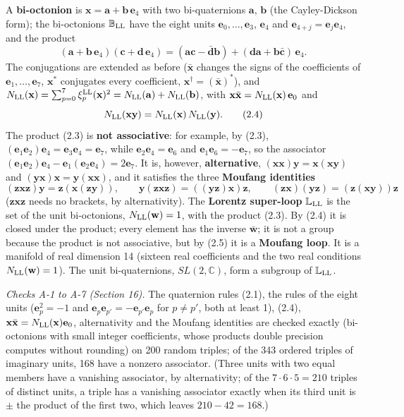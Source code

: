 \documentclass[
  10pt,
]{article}
\begin{document}
A \textbf{bi-octonion} is \(\mathbf x=\mathbf a+\mathbf b\,\mathbf e_4\)
with two bi-quaternions \(\mathbf a\), \(\mathbf b\) (the Cayley-Dickson
form); the bi-octonions \(\mathbb B_{\rm LL}\) have the eight units
\(\mathbf e_0,\dots,\mathbf e_3\), \(\mathbf e_4\) and
\(\mathbf e_{4+j}=\mathbf e_j\mathbf e_4\), and the product
\[(\mathbf a+\mathbf b\,\mathbf e_4)(\mathbf c+\mathbf d\,\mathbf e_4)=(\mathbf a\mathbf c-\bar{\mathbf d}\mathbf b)+(\mathbf d\mathbf a+\mathbf b\bar{\mathbf c})\,\mathbf e_4.\tag{2.3}\]
The conjugations are extended as before (\(\bar{\mathbf x}\) changes the
signs of the coefficients of \(\mathbf e_1,\dots,\mathbf e_7\),
\(\mathbf x^*\) conjugates every coefficient,
\(\mathbf x^\dagger=(\bar{\mathbf x})^*\)), and
\(N_{\rm LL}(\mathbf x)=\sum_{p=0}^7\xi^{\rm LL}_p(\mathbf x)^2=N_{\rm LL}(\mathbf a)+N_{\rm LL}(\mathbf b)\),
with \(\mathbf x\bar{\mathbf x}=N_{\rm LL}(\mathbf x)\,\mathbf e_0\) and
\[N_{\rm LL}(\mathbf x\mathbf y)=N_{\rm LL}(\mathbf x)\,N_{\rm LL}(\mathbf y).\tag{2.4}\]
The product (2.3) is \textbf{not associative}: for example, by (2.3),
\((\mathbf e_1\mathbf e_2)\mathbf e_4=\mathbf e_3\mathbf e_4=\mathbf e_7\),
while \(\mathbf e_2\mathbf e_4=\mathbf e_6\) and
\(\mathbf e_1\mathbf e_6=-\mathbf e_7\), so the associator
\((\mathbf e_1\mathbf e_2)\mathbf e_4-\mathbf e_1(\mathbf e_2\mathbf e_4)=2\mathbf e_7\).
It is, however, \textbf{alternative},
\((\mathbf x\mathbf x)\mathbf y=\mathbf x(\mathbf x\mathbf y)\) and
\((\mathbf y\mathbf x)\mathbf x=\mathbf y(\mathbf x\mathbf x)\), and it
satisfies the three \textbf{Moufang identities}
\[(\mathbf z\mathbf x\mathbf z)\mathbf y=\mathbf z(\mathbf x(\mathbf z\mathbf y)),\qquad\mathbf y(\mathbf z\mathbf x\mathbf z)=((\mathbf y\mathbf z)\mathbf x)\mathbf z,\qquad(\mathbf z\mathbf x)(\mathbf y\mathbf z)=(\mathbf z(\mathbf x\mathbf y))\mathbf z\tag{2.5}\]
(\(\mathbf z\mathbf x\mathbf z\) needs no brackets, by alternativity).
The \textbf{Lorentz super-loop} \(\mathbb L_{\rm LL}\) is the set of the
unit bi-octonions, \(N_{\rm LL}(\mathbf w)=1\), with the product (2.3).
By (2.4) it is closed under the product; every element has the inverse
\(\bar{\mathbf w}\); it is not a group because the product is not
associative, but by (2.5) it is a \textbf{Moufang loop}. It is a
manifold of real dimension 14 (sixteen real coefficients and the two
real conditions \(N_{\rm LL}(\mathbf w)=1\)). The unit bi-quaternions,
\(SL(2,\mathbb C)\), form a subgroup of \(\mathbb L_{\rm LL}\).

\emph{Checks A-1 to A-7 (Section 16).} The quaternion rules (2.1), the
rules of the eight units (\(\mathbf e_p^2=-1\) and
\(\mathbf e_p\mathbf e_{p'}=-\mathbf e_{p'}\mathbf e_p\) for
\(p\neq p'\), both at least 1), (2.4),
\(\mathbf x\bar{\mathbf x}=N_{\rm LL}(\mathbf x)\mathbf e_0\),
alternativity and the Moufang identities are checked exactly
(bi-octonions with small integer coefficients, whose products double
precision computes without rounding) on 200 random triples; of the 343
ordered triples of imaginary units, 168 have a nonzero associator.
(Three units with two equal members have a vanishing associator, by
alternativity; of the \(7\cdot6\cdot5=210\) triples of distinct units, a
triple has a vanishing associator exactly when its third unit is \(\pm\)
the product of the first two, which leaves \(210-42=168\).)
\end{document}
